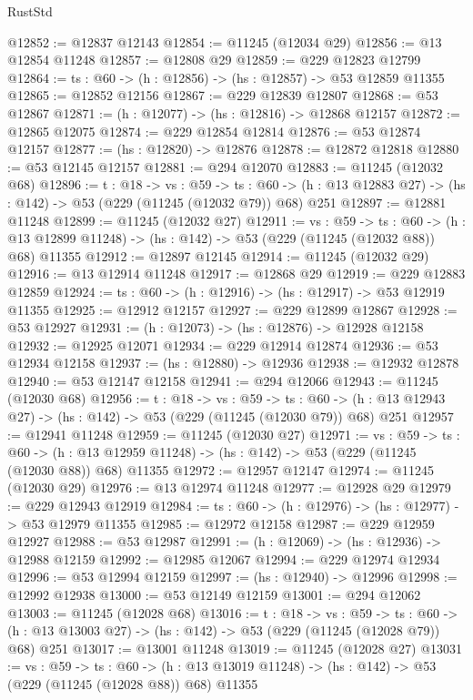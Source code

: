 \begin{lexlean}{RustStd}
\begin{coremodule}
@12852 := @12837 @12143
@12854 := @11245 (@12034 @29)
@12856 := @13 @12854 @11248
@12857 := @12808 @29
@12859 := @229 @12823 @12799
@12864 := {ts : @60} -> (h : @12856) -> (hs : @12857) -> @53 @12859 @11355
@12865 := @12852 @12156
@12867 := @229 @12839 @12807
@12868 := @53 @12867
@12871 := (h : @12077) -> (hs : @12816) -> @12868 @12157
@12872 := @12865 @12075
@12874 := @229 @12854 @12814
@12876 := @53 @12874 @12157
@12877 := (hs : @12820) -> @12876
@12878 := @12872 @12818
@12880 := @53 @12145 @12157
@12881 := @294 @12070
@12883 := @11245 (@12032 @68)
@12896 := {t : @18} ->
  {vs : @59} ->
  {ts : @60} -> (h : @13 @12883 @27) -> (hs : @142) -> @53 (@229 (@11245 (@12032 @79)) @68) @251
@12897 := @12881 @11248
@12899 := @11245 (@12032 @27)
@12911 := {vs : @59} ->
  {ts : @60} ->
  (h : @13 @12899 @11248) -> (hs : @142) -> @53 (@229 (@11245 (@12032 @88)) @68) @11355
@12912 := @12897 @12145
@12914 := @11245 (@12032 @29)
@12916 := @13 @12914 @11248
@12917 := @12868 @29
@12919 := @229 @12883 @12859
@12924 := {ts : @60} -> (h : @12916) -> (hs : @12917) -> @53 @12919 @11355
@12925 := @12912 @12157
@12927 := @229 @12899 @12867
@12928 := @53 @12927
@12931 := (h : @12073) -> (hs : @12876) -> @12928 @12158
@12932 := @12925 @12071
@12934 := @229 @12914 @12874
@12936 := @53 @12934 @12158
@12937 := (hs : @12880) -> @12936
@12938 := @12932 @12878
@12940 := @53 @12147 @12158
@12941 := @294 @12066
@12943 := @11245 (@12030 @68)
@12956 := {t : @18} ->
  {vs : @59} ->
  {ts : @60} -> (h : @13 @12943 @27) -> (hs : @142) -> @53 (@229 (@11245 (@12030 @79)) @68) @251
@12957 := @12941 @11248
@12959 := @11245 (@12030 @27)
@12971 := {vs : @59} ->
  {ts : @60} ->
  (h : @13 @12959 @11248) -> (hs : @142) -> @53 (@229 (@11245 (@12030 @88)) @68) @11355
@12972 := @12957 @12147
@12974 := @11245 (@12030 @29)
@12976 := @13 @12974 @11248
@12977 := @12928 @29
@12979 := @229 @12943 @12919
@12984 := {ts : @60} -> (h : @12976) -> (hs : @12977) -> @53 @12979 @11355
@12985 := @12972 @12158
@12987 := @229 @12959 @12927
@12988 := @53 @12987
@12991 := (h : @12069) -> (hs : @12936) -> @12988 @12159
@12992 := @12985 @12067
@12994 := @229 @12974 @12934
@12996 := @53 @12994 @12159
@12997 := (hs : @12940) -> @12996
@12998 := @12992 @12938
@13000 := @53 @12149 @12159
@13001 := @294 @12062
@13003 := @11245 (@12028 @68)
@13016 := {t : @18} ->
  {vs : @59} ->
  {ts : @60} -> (h : @13 @13003 @27) -> (hs : @142) -> @53 (@229 (@11245 (@12028 @79)) @68) @251
@13017 := @13001 @11248
@13019 := @11245 (@12028 @27)
@13031 := {vs : @59} ->
  {ts : @60} ->
  (h : @13 @13019 @11248) -> (hs : @142) -> @53 (@229 (@11245 (@12028 @88)) @68) @11355

\end{coremodule}
\end{lexlean}
